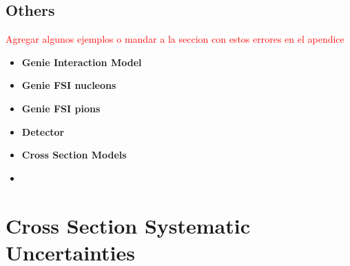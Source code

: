 \subsection{Others}
\label{Cap:ErrorAnalysis:SystematicUnc:Others}
\textcolor{red}{Agregar algunos ejemplos o mandar a la seccion con estos errores en el apendice}



\begin{itemize}
    \item \textbf{Genie Interaction Model}
    \item \textbf{Genie FSI nucleons}
    \item \textbf{Genie FSI pions}
    \item \textbf{Detector}
    \item \textbf{Cross Section Models}
    \item \textbf{}
\end{itemize}



\section{Cross Section Systematic Uncertainties}
\label{Cap:ErrorAnalysis:CrossSectionUncertainties}

